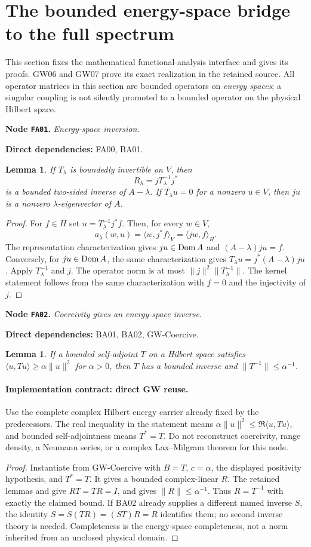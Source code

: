 \documentclass[11pt,a4paper]{article}
\newtheorem{lemma}[theorem]{Lemma}
\theoremstyle{remark}\newtheorem{remark}[theorem]{Remark}
\newcommand{\ip}[2]{\langle #1,#2\rangle}\newcommand{\norm}[1]{\lVert #1\rVert}
\newcommand{\node}[3]{\par\Needspace{6\baselineskip}\smallskip\hypertarget{node:#1}{}\label{nodepage:#1}\noindent\textbf{Node \texttt{#1}.} \textit{#2.}\par\noindent\textbf{Direct dependencies:} #3.\par}
\begin{document}
\section{The bounded energy-space bridge to the full spectrum}\label{sec:abstract}
This section fixes the mathematical functional-analysis interface and gives its proofs. GW06 and GW07 prove its exact realization in the retained source. All operator matrices in this section are bounded operators on \emph{energy spaces}; a singular coupling is not silently promoted to a bounded operator on the physical Hilbert space.

\node{FA01}{Energy-space inversion}{FA00, BA01}
\begin{lemma}\label{lem:forminverse}
If $T_\lambda$ is boundedly invertible on $V$, then
\[
 R_\lambda=jT_\lambda^{-1}j^*
\]
is a bounded two-sided inverse of $A-\lambda$. If $T_\lambda u=0$ for a nonzero $u\in V$, then $ju$ is a nonzero $\lambda$-eigenvector of $A$.
\end{lemma}
\begin{proof}
For $f\in H$ set $u=T_\lambda^{-1}j^*f$. Then, for every $w\in V$,
\[
 a_\lambda(w,u)=\ip{w}{j^*f}_V=\ip{jw}{f}_H.
\]
The representation characterization gives $ju\in\operatorname{Dom} A$ and $(A-\lambda)ju=f$. Conversely, for $ju\in\operatorname{Dom} A$, the same characterization gives $T_\lambda u=j^*(A-\lambda)ju$. Apply $T_\lambda^{-1}$ and $j$. The operator norm is at most $\norm j^2\norm{T_\lambda^{-1}}$. The kernel statement follows from the same characterization with $f=0$ and the injectivity of $j$.
\end{proof}

\node{FA02}{Coercivity gives an energy-space inverse}{BA01, BA02, GW-Coercive}
\begin{lemma}\label{lem:coercive}
If a bounded self-adjoint $T$ on a Hilbert space satisfies $\ip u{Tu}\geq\alpha\norm u^2$ for $\alpha>0$, then $T$ has a bounded inverse and $\norm{T^{-1}}\leq\alpha^{-1}$.
\end{lemma}
\paragraph{Implementation contract: direct GW reuse.}
Use the complete complex Hilbert energy carrier already fixed by the predecessors. The real inequality in the statement means
$\alpha\|u\|^2\leq\Re\langle u,Tu\rangle$, and bounded self-adjointness means $T^*=T$. Do not reconstruct coercivity, range density, a Neumann series, or a complex Lax--Milgram theorem for this node.
\begin{proof}
Instantiate  from GW-Coercive with $B=T$, $c=\alpha$, the displayed positivity hypothesis, and $T^*=T$. It gives a bounded complex-linear $R$. The retained lemmas  and  give $RT=TR=I$, and  gives $\|R\|\leq\alpha^{-1}$. Thus $R=T^{-1}$ with exactly the claimed bound. If BA02 already supplies a different named inverse $S$, the identity $S=S(TR)=(ST)R=R$ identifies them; no second inverse theory is needed. Completeness is the energy-space completeness, not a norm inherited from an unclosed physical domain.
\end{proof}
\end{document}

